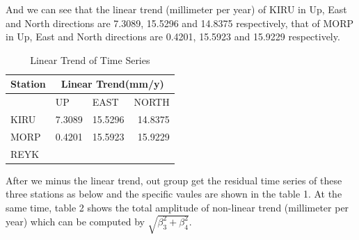 \documentclass{article}
\begin{document}
And we can see that the linear trend (millimeter per year) of KIRU in Up, East and North directions are 7.3089, 15.5296 and 14.8375 respectively, 
 that of MORP in Up, East and North directions are 0.4201, 15.5923 and 15.9229 respectively.
 \vspace{5pt}
\begin{table}[H]
  \centering
  \caption{Linear Trend of Time Series}
    \begin{tabular}{lrrr}
    \large Station & \multicolumn{3}{c}{\large Linear Trend(mm/y)} \\
    \midrule
          & \multicolumn{1}{l}{\large UP} & \multicolumn{1}{l}{\large EAST} & \multicolumn{1}{l}{\large NORTH} \\ [5pt]
          
     KIRU  &7.3089&15.5296&14.8375\\[3pt]
     MORP  &0.4201&15.5923&15.9229\\ [3pt]
     REYK  &       &       &  \\
    \end{tabular}%
  \label{Tab:lin_trend}%
\end{table}

After we minus the linear trend, out group get the residual time series of these three stations as below 
and the specific vaules are shown in the table 1. 
At the same time, table 2 shows the total amplitude of non-linear trend (millimeter per year) which can be computed by $\sqrt{\beta_3^2+\beta_4^2}$.
\end{document}
